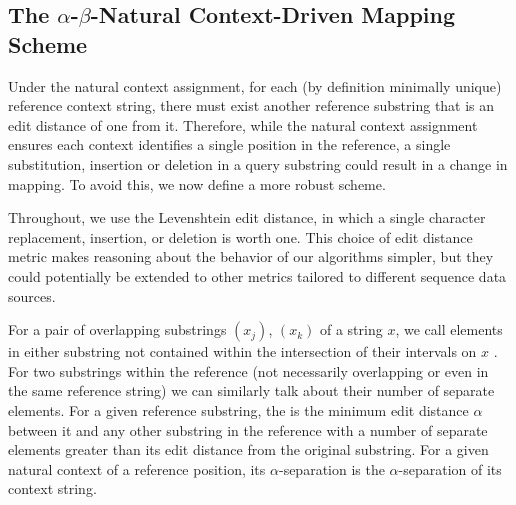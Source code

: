 \subsection{The $\alpha$-$\beta$-Natural Context-Driven Mapping Scheme}

Under the natural context assignment, for each (by definition minimally unique) reference context string, there must exist another reference substring that is an edit distance of one from it.  Therefore, while the natural context assignment ensures each context identifies a single position in the reference, a single substitution, insertion or deletion in a query substring could result in a change in mapping. To avoid this, we now define a more robust scheme.

Throughout, we use the Levenshtein edit distance, in which a single character replacement, insertion, or deletion is worth one. This choice of edit distance metric makes reasoning about the behavior of our algorithms simpler, but they could potentially be extended to other metrics tailored to different sequence data sources.



For a pair of overlapping substrings $(x_j)$, $(x_k)$ of a string $x$, we call elements in either substring not contained within the intersection of their intervals on $x$ .  For two substrings within the reference (not necessarily overlapping or even in the same reference string) we can similarly talk about their number of separate elements. For a given reference substring, the  is the minimum edit distance $\alpha$ between it and any other substring in the reference with a number of separate elements greater than its edit distance from the original substring. For a given natural context of a reference position, its $\alpha$-separation is the $\alpha$-separation of its context string.

